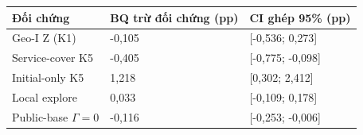 \par\smallskip\noindent\begin{tabularx}{\linewidth}{@{}P{6cm}XX@{}}\toprule
\textbf{Đối chứng} & \textbf{BQ trừ đối chứng (pp)} & \textbf{CI ghép 95\% (pp)} \\
\midrule
Geo-I Z (K1) & -0{,}105 & [-0{,}536; 0{,}273] \\
Service-cover K5 & -0{,}405 & [-0{,}775; -0{,}098] \\
Initial-only K5 & 1{,}218 & [0{,}302; 2{,}412] \\
Local explore & 0{,}033 & [-0{,}109; 0{,}178] \\
Public-base $\Gamma=0$ & -0{,}116 & [-0{,}253; -0{,}006] \\
\bottomrule\end{tabularx}\par\smallskip
